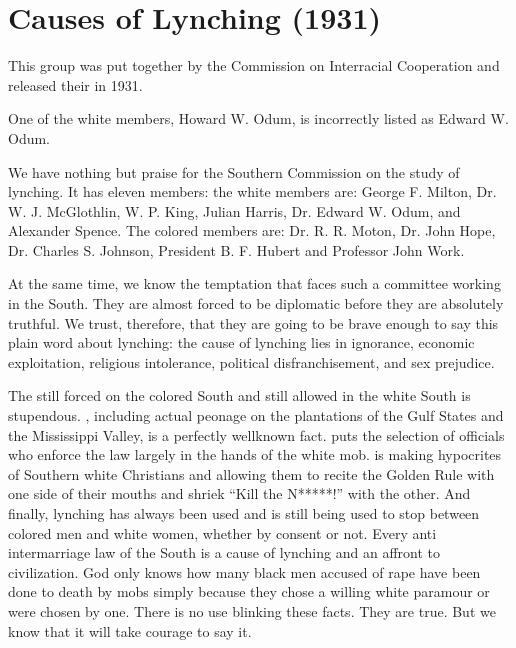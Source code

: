 \documentclass[letterpaper,10pt,english]{jupyterBook}
\begin{document}
\section{Causes of Lynching (1931)}
\label{\detokenize{Volumes/38/04/causes_of_lynching:causes-of-lynching-1931}}\label{\detokenize{Volumes/38/04/causes_of_lynching::doc}}
\begin{sphinxShadowBox}
\sphinxstylesidebartitle{}

\sphinxAtStartPar
This group was put together by the Commission on Interracial Cooperation and released their  in 1931.

\sphinxAtStartPar
One of the white members, Howard W. Odum, is incorrectly listed as Edward W. Odum.
\end{sphinxShadowBox}

\sphinxAtStartPar
We have nothing but praise for the Southern Commission on the study of lynching. It has eleven members: the white members are: George F. Milton, Dr. W. J. McGlothlin, W. P. King, Julian Harris, Dr. Edward W. Odum, and Alexander Spence. The colored members are: Dr. R. R. Moton, Dr. John Hope, Dr. Charles S. Johnson, President B. F. Hubert and Professor John Work.

\sphinxAtStartPar
At the same time, we know the temptation that faces such a committee working in the South. They are almost forced to be diplomatic before they are absolutely truthful. We trust, therefore, that they are going to be brave enough to say this plain word about lynching: the cause of lynching lies in ignorance, economic exploitation, religious intolerance, political disfranchisement, and sex prejudice.

\sphinxAtStartPar
The  still forced on the colored South and still allowed in the white South is stupendous. , including actual peonage on the plantations of the Gulf States and the Mississippi Valley, is a perfectly well\sphinxhyphen{}known fact.  puts the selection of officials who enforce the law largely in the hands of the white mob.  is making hypocrites of Southern white Christians and allowing them to recite the Golden Rule with one side of their mouths and shriek “Kill the N*****!” with the other. And finally, lynching has always been used and is still being used to stop  between colored men and white women, whether by consent or not. Every anti intermarriage law of the South is a cause of lynching and an affront to civilization. God only knows how many black men accused of rape have been done to death by mobs simply because they chose a willing white paramour or were chosen by one. There is no use blinking these facts. They are true. But we know that it will take courage to say it.
\end{document}
